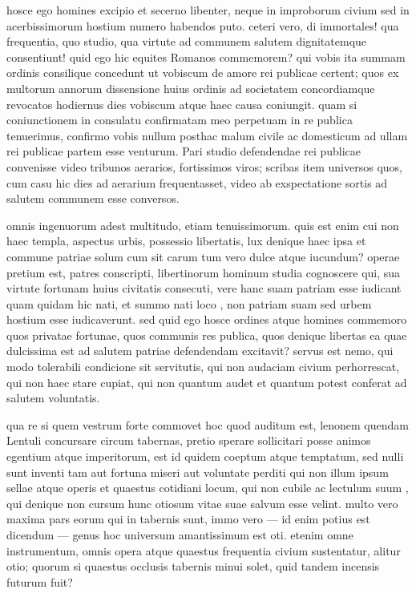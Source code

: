  hosce ego homines excipio et secerno libenter, neque in improborum civium sed in acerbissimorum hostium numero habendos puto. ceteri vero, di immortales! qua frequentia, quo studio, qua virtute ad communem salutem dignitatemque consentiunt! quid ego hic equites Romanos commemorem? qui vobis ita summam ordinis consilique concedunt ut vobiscum de amore rei publicae certent; quos ex multorum annorum dissensione huius ordinis ad societatem concordiamque revocatos hodiernus dies vobiscum atque haec causa coniungit. quam si coniunctionem in consulatu confirmatam meo perpetuam in re publica tenuerimus, confirmo vobis nullum posthac malum civile ac domesticum ad ullam rei publicae partem esse venturum. Pari studio defendendae rei publicae convenisse video tribunos aerarios, fortissimos viros; scribas item universos quos, cum casu hic dies ad aerarium frequentasset, video ab exspectatione sortis ad salutem communem esse conversos.

 omnis ingenuorum adest multitudo, etiam tenuissimorum. quis est enim cui non haec templa, aspectus urbis, possessio libertatis, lux denique haec ipsa et commune patriae solum cum sit carum tum vero dulce atque iucundum? operae pretium est, patres conscripti, libertinorum hominum studia cognoscere qui, sua virtute fortunam huius civitatis consecuti, vere hanc suam patriam esse iudicant quam quidam hic nati, et summo nati loco , non patriam suam sed urbem hostium esse iudicaverunt. sed quid ego hosce ordines atque homines commemoro quos privatae fortunae, quos communis res publica, quos denique libertas ea quae dulcissima est ad salutem patriae defendendam excitavit? servus est nemo, qui modo tolerabili condicione sit servitutis, qui non audaciam civium perhorrescat, qui non haec stare cupiat, qui non quantum audet et quantum potest conferat ad salutem voluntatis.

 qua re si quem vestrum forte commovet hoc quod auditum est, lenonem quendam Lentuli concursare circum tabernas, pretio sperare sollicitari posse animos egentium atque imperitorum, est id quidem coeptum atque temptatum, sed nulli sunt inventi tam aut fortuna miseri aut voluntate perditi qui non illum ipsum sellae atque operis et quaestus cotidiani locum, qui non cubile ac lectulum suum , qui denique non cursum hunc otiosum vitae suae salvum esse velint. multo vero maxima pars eorum qui in tabernis sunt, immo vero — id enim potius est dicendum — genus hoc universum amantissimum est oti. etenim omne instrumentum, omnis opera atque quaestus frequentia civium sustentatur, alitur otio; quorum si quaestus occlusis tabernis minui solet, quid tandem incensis futurum fuit?

